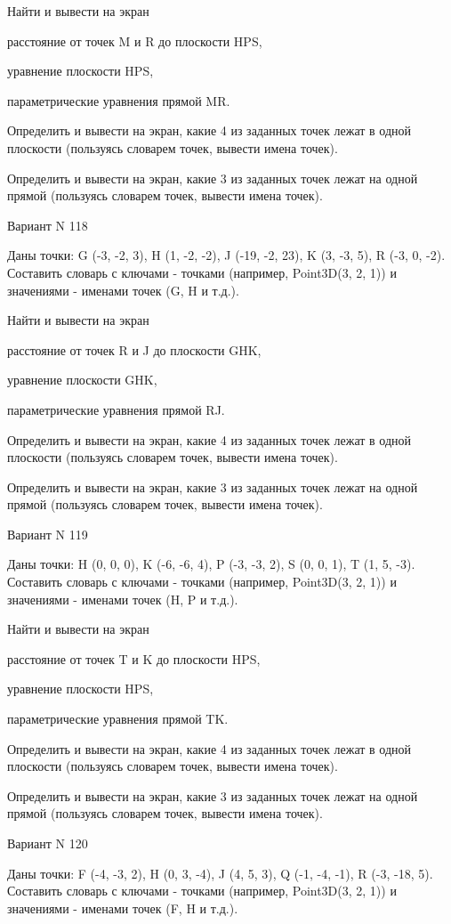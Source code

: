 \documentclass[11pt]{report}
\begin{document}
 
Найти и вывести на экран


расстояние от точек M и R до плоскости HPS,

 
уравнение плоскости HPS,

 
параметрические уравнения прямой MR.


Определить и вывести на экран, какие 4 из заданных точек лежат в одной плоскости (пользуясь словарем точек, вывести имена точек).


Определить и вывести на экран, какие 3 из заданных точек лежат на одной прямой (пользуясь словарем точек, вывести имена точек).

Вариант N 118

Даны точки: G (-3, -2, 3), H (1, -2, -2), J (-19, -2, 23), K (3, -3, 5), R (-3, 0, -2).
Составить словарь с ключами - точками (например, Point3D(3, 2, 1)) и значениями - именами точек (G, H и т.д.).

 
Найти и вывести на экран


расстояние от точек R и J до плоскости GHK,

 
уравнение плоскости GHK,

 
параметрические уравнения прямой RJ.


Определить и вывести на экран, какие 4 из заданных точек лежат в одной плоскости (пользуясь словарем точек, вывести имена точек).


Определить и вывести на экран, какие 3 из заданных точек лежат на одной прямой (пользуясь словарем точек, вывести имена точек).

Вариант N 119

Даны точки: H (0, 0, 0), K (-6, -6, 4), P (-3, -3, 2), S (0, 0, 1), T (1, 5, -3).
Составить словарь с ключами - точками (например, Point3D(3, 2, 1)) и значениями - именами точек (H, P и т.д.).

 
Найти и вывести на экран


расстояние от точек T и K до плоскости HPS,

 
уравнение плоскости HPS,

 
параметрические уравнения прямой TK.


Определить и вывести на экран, какие 4 из заданных точек лежат в одной плоскости (пользуясь словарем точек, вывести имена точек).


Определить и вывести на экран, какие 3 из заданных точек лежат на одной прямой (пользуясь словарем точек, вывести имена точек).

Вариант N 120

Даны точки: F (-4, -3, 2), H (0, 3, -4), J (4, 5, 3), Q (-1, -4, -1), R (-3, -18, 5).
Составить словарь с ключами - точками (например, Point3D(3, 2, 1)) и значениями - именами точек (F, H и т.д.).
\end{document}
